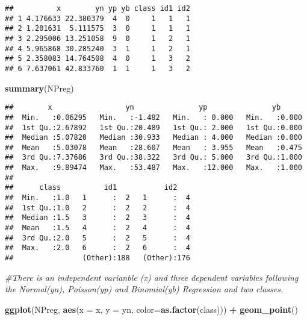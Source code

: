 \documentclass[]{article}
\newenvironment{Shaded}{\begin{snugshade}}{\end{snugshade}}
\newcommand{\CommentTok}[1]{\textcolor[rgb]{0.56,0.35,0.01}{\textit{#1}}}
\newcommand{\DataTypeTok}[1]{\textcolor[rgb]{0.13,0.29,0.53}{#1}}
\newcommand{\KeywordTok}[1]{\textcolor[rgb]{0.13,0.29,0.53}{\textbf{#1}}}
\newcommand{\NormalTok}[1]{#1}
\newcommand{\OperatorTok}[1]{\textcolor[rgb]{0.81,0.36,0.00}{\textbf{#1}}}
\newcommand{\StringTok}[1]{\textcolor[rgb]{0.31,0.60,0.02}{#1}}
\begin{document}
\begin{verbatim}
##          x        yn yp yb class id1 id2
## 1 4.176633 22.380379  4  0     1   1   1
## 2 1.201631  5.111575  3  0     1   1   1
## 3 2.295006 13.251058  9  0     1   2   1
## 4 5.965868 30.285240  3  1     1   2   1
## 5 2.358083 14.764508  4  0     1   3   2
## 6 7.637061 42.833760  1  1     1   3   2
\end{verbatim}

\begin{Shaded}
\begin{Highlighting}[]
\KeywordTok{summary}\NormalTok{(NPreg)}
\end{Highlighting}
\end{Shaded}

\begin{verbatim}
##        x                 yn               yp               yb       
##  Min.   :0.06295   Min.   :-1.482   Min.   : 0.000   Min.   :0.000  
##  1st Qu.:2.67892   1st Qu.:20.489   1st Qu.: 2.000   1st Qu.:0.000  
##  Median :5.07820   Median :30.933   Median : 4.000   Median :0.000  
##  Mean   :5.03078   Mean   :28.607   Mean   : 3.955   Mean   :0.475  
##  3rd Qu.:7.37686   3rd Qu.:38.322   3rd Qu.: 5.000   3rd Qu.:1.000  
##  Max.   :9.89474   Max.   :53.487   Max.   :12.000   Max.   :1.000  
##                                                                     
##      class          id1           id2     
##  Min.   :1.0   1      :  2   1      :  4  
##  1st Qu.:1.0   2      :  2   2      :  4  
##  Median :1.5   3      :  2   3      :  4  
##  Mean   :1.5   4      :  2   4      :  4  
##  3rd Qu.:2.0   5      :  2   5      :  4  
##  Max.   :2.0   6      :  2   6      :  4  
##                (Other):188   (Other):176
\end{verbatim}

\begin{Shaded}
\begin{Highlighting}[]
\CommentTok{#There is an independent varianble (x) and three dependent variables following the Normal(yn), Poisson(yp) and Binomial(yb) Regression and two  classes.}

\KeywordTok{ggplot}\NormalTok{(NPreg, }\KeywordTok{aes}\NormalTok{(}\DataTypeTok{x =}\NormalTok{ x, }\DataTypeTok{y =}\NormalTok{ yn, }\DataTypeTok{color=}\KeywordTok{as.factor}\NormalTok{(class))) }\OperatorTok{+}\StringTok{ }\KeywordTok{geom_point}\NormalTok{()}
\end{Highlighting}
\end{Shaded}
\end{document}
